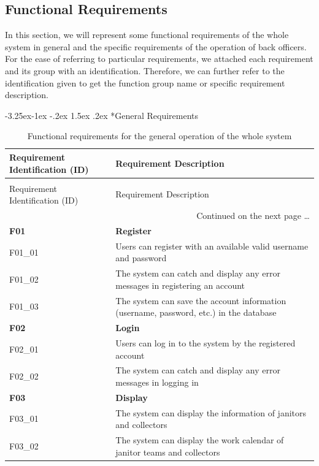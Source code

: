 \documentclass[a4paper, 13pt]{article}
\makeatletter
\newcounter {subsubsubsection}[subsubsection]
\newcommand\subsubsubsection{\@startsection{subsubsubsection}{4}{\z@}%
                                     {-3.25ex\@plus -1ex \@minus -.2ex}%
                                     {1.5ex \@plus .2ex}%
                                     {\normalfont\normalsize\bfseries}}
\makeatother
\begin{document}
\subsection{Functional Requirements}
\begin{tcolorbox}[colback=blue!5!white,colframe=blue!75!black]
  In this section, we will represent some functional requirements of the whole system in general and the specific requirements of the operation of back officers. For the ease of referring to particular requirements, we attached each requirement and its group with an identification. Therefore, we can further refer to the identification given to get the function group name or specific requirement description.
\end{tcolorbox}
\subsubsubsection*{General Requirements}
\begin{longtable}{|p{}|p{}|} 
    \hline
         \textbf{Requirement Identification (ID)} & \textbf{Requirement Description} \\
         \hline 
         \endfirsthead
         
         \hline
        \caption{Functional requirements for the general operation of the whole system} \\
         \endlastfoot

         \hline
         \multicolumn{2}{l}{Continued from the previous page.}
         \hline
          Requirement Identification (ID) & Requirement Description \\
          \hline
          \endhead

          \hline
         \multicolumn{2}{r}{Continued on the next page \ldots}\\
         \hline
        \endfoot
        
         \rowcolor{moccasin} \textbf{F01} & \textbf{Register} \\
         \hline
         F01\_01 &  Users can register with an available valid username and password \\
         \hline
         F01\_02 &  The system can catch and display any error messages in registering an account \\
         \hline
         F01\_03 &  The system can save the account information (username, password, etc.) in the database \\
         \hline
         \rowcolor{moccasin} \textbf{F02} & \textbf{Login} \\
         \hline
         F02\_01 &  Users can log in to the system by the registered account \\ 
                  \hline
         F02\_02 &  The system can catch and display any error messages in logging in \\
         \hline
         \rowcolor{moccasin} \textbf{F03} & \textbf{Display} \\
         \hline
         F03\_01 &  The system can display the information of janitors and collectors \\
         \hline
         F03\_02 &  The system can display the work calendar of janitor teams and collectors \\         \hline


\end{longtable}
\end{document}
